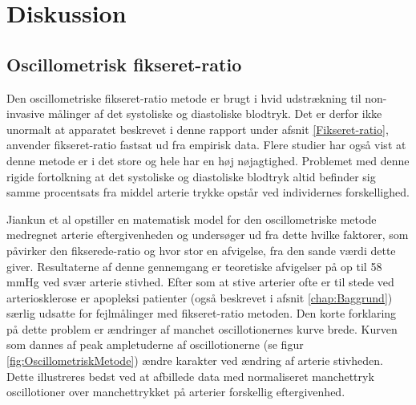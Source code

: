 \chapter{Diskussion}

\section{Oscillometrisk fikseret-ratio}
Den oscillometriske fikseret-ratio metode er brugt i hvid udstrækning til non-invasive målinger af det systoliske og diastoliske blodtryk. Det er derfor ikke unormalt at apparatet beskrevet i denne rapport under afsnit \ref{Fikseret-ratio}, anvender fikseret-ratio fastsat ud fra empirisk data. Flere studier har også vist at denne metode er i det store og hele har en høj nøjagtighed. Problemet med denne rigide fortolkning at det systoliske og diastoliske blodtryk altid befinder sig samme procentsats fra middel arterie trykke opstår ved individernes forskellighed.

Jiankun et al opstiller en matematisk model for den oscillometriske metode medregnet arterie eftergivenheden og undersøger ud fra dette hvilke faktorer, som påvirker den fikserede-ratio og hvor stor en afvigelse, fra den sande værdi dette giver. Resultaterne af denne gennemgang er teoretiske afvigelser på op til 58 mmHg ved svær arterie stivhed. Efter som at stive arterier ofte er til stede ved  arteriosklerose er apopleksi patienter (også beskrevet i afsnit \ref{chap:Baggrund}) særlig udsatte for fejlmålinger med fikseret-ratio metoden. Den korte forklaring på dette problem er ændringer af manchet oscillotionernes kurve brede. Kurven som dannes af peak ampletuderne af oscillotionerne (se figur \ref{fig:OscillometriskMetode}) ændre karakter ved ændring af arterie stivheden. Dette illustreres bedst ved at afbillede data med normaliseret manchettryk oscillotioner over manchettrykket på arterier forskellig eftergivenhed. 

